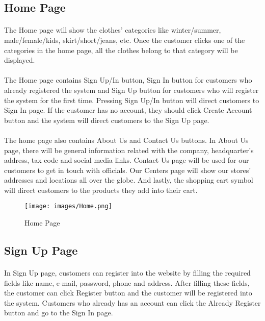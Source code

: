 \documentclass[12pt]{article}
\begin{document}
\newpage
\subsection{Home Page}
\bigskip
\paragraph{}
The Home page will show the clothes’ categories like winter/summer,  male/\newline female/kids, skirt/short/jeans, etc. Once the customer clicks one of the categories in the home page, all the clothes belong to that category will be displayed. 
\paragraph{}
The Home page contains Sign Up/In button, Sign In button for customers who already registered the system and Sign Up button for customers who will register the system for the first time. Pressing Sign Up/In button will direct customers to Sign In page. If the customer has no account, they should click Create Account button and the system will direct customers to the Sign Up page.
\paragraph{}
The home page also contains About Us and Contact Us buttons. In About Us page, there will be general information related with the company, headquarter’s address, tax code and social media links. Contact Us page will be used for our customers to get in touch with officials. Our Centers page will show our stores’ addresses and locations all over the globe. And lastly, the shopping cart symbol will direct customers to the products they add into their cart.

\bigskip
\bigskip
\bigskip
\begin{figure}[h]
\centerline{\texttt{[image: images/Home.png]}}
\caption{Home Page}
\label{fig}
\end{figure}

\newpage
\subsection{Sign Up Page}
\bigskip
\paragraph{}
In Sign Up page, customers can register into the website by filling the required fields like name, e-mail, password, phone and address. After filling these fields, the customer can click Register button and the customer will be registered into the system. Customers who already has an account can click the Already Register button and go to the Sign In page. 
\end{document}
